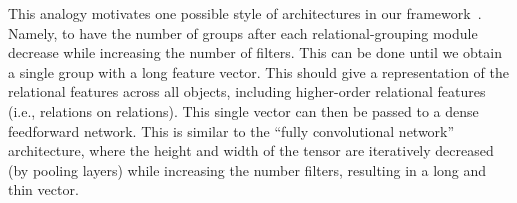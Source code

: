 
This analogy motivates one possible style of architectures in our framework~. Namely, to have the number of groups after each relational-grouping module decrease while increasing the number of filters. This can be done until we obtain a single group with a long feature vector. This should give a representation of the relational features across all objects, including higher-order relational features (i.e., relations on relations). This single vector can then be passed to a dense feedforward network. This is similar to the ``fully convolutional network'' architecture, where the height and width of the tensor are iteratively decreased (by pooling layers) while increasing the number filters, resulting in a long and thin vector.


